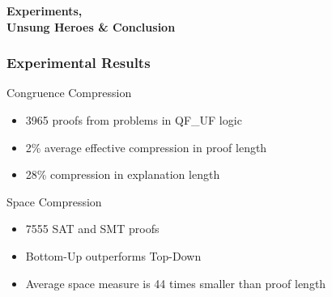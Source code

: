 \documentclass{beamer}
\begin{document}


\begin{frame}

\centering \textbf{\huge{Experiments,\\ Unsung Heroes \& Conclusion}}

\end{frame}

\begin{frame}

\frametitle{Experimental Results}

\begin{block}{Congruence Compression}
	\begin{itemize}
		\item 3965 proofs from problems in QF\_UF logic
		\item 2\% average effective compression in proof length
		\item 28\% compression in explanation length
	\end{itemize}
\end{block}

\begin{block}{Space Compression}
	\begin{itemize}
		\item 7555 SAT and SMT proofs
		\item Bottom-Up outperforms Top-Down
		\item Average space measure is 44 times smaller than proof length
	\end{itemize}
\end{block}

\end{frame}
\end{document}
